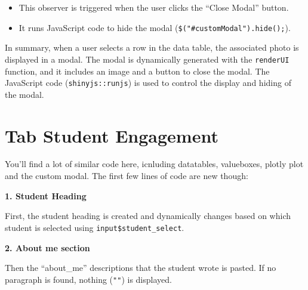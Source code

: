 \documentclass[
]{book}
\newenvironment{Shaded}{\begin{snugshade}}{\end{snugshade}}
\newcommand{\AttributeTok}[1]{\textcolor[rgb]{0.13,0.29,0.53}{#1}}
\newcommand{\CommentTok}[1]{\textcolor[rgb]{0.56,0.35,0.01}{\textit{#1}}}
\newcommand{\FunctionTok}[1]{\textcolor[rgb]{0.13,0.29,0.53}{\textbf{#1}}}
\newcommand{\NormalTok}[1]{#1}
\newcommand{\OtherTok}[1]{\textcolor[rgb]{0.56,0.35,0.01}{#1}}
\newcommand{\SpecialCharTok}[1]{\textcolor[rgb]{0.81,0.36,0.00}{\textbf{#1}}}
\newcommand{\StringTok}[1]{\textcolor[rgb]{0.31,0.60,0.02}{#1}}
\providecommand{\tightlist}{%
  \setlength{\itemsep}{0pt}\setlength{\parskip}{0pt}}
\begin{document}
\begin{enumerate}
  \begin{itemize}
  \tightlist
  \item
    This observer is triggered when the user clicks the ``Close Modal'' button.
  \item
    It runs JavaScript code to hide the modal (\texttt{\$("\#customModal").hide();}).
  \end{itemize}
\end{enumerate}

In summary, when a user selects a row in the data table, the associated photo is displayed in a modal. The modal is dynamically generated with the \texttt{renderUI} function, and it includes an image and a button to close the modal. The JavaScript code (\texttt{shinyjs::runjs}) is used to control the display and hiding of the modal.

\hypertarget{tab-student-engagement}{%
\section{Tab Student Engagement}\label{tab-student-engagement}}

You'll find a lot of similar code here, icnluding datatables, valueboxes, plotly plot and the custom modal. The first few lines of code are new though:

\textbf{1. Student Heading}

First, the student heading is created and dynamically changes based on which student is selected using \texttt{input\$student\_select}.

\begin{Shaded}
\end{Shaded}

\textbf{2. About me section}

Then the ``about\_me'' descriptions that the student wrote is pasted. If no paragraph is found, nothing (\texttt{""}) is displayed.
\end{document}
